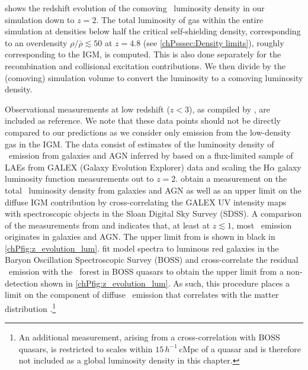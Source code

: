  shows the redshift evolution of the comoving \lya\ luminosity density in our simulation down to $z=2$. The total luminosity of gas within the entire simulation at densities below half the critical self-shielding density, corresponding to an overdensity $\rho/\bar{\rho} \lesssim 50$ at $z=4.8$ (see \cref{chPsssec:Density limits}), roughly corresponding to the IGM, is computed. This is also done separately for the recombination and collisional excitation contributions. We then divide by the (comoving) simulation volume to convert the luminosity to a comoving luminosity density.

Observational measurements at low redshift ($z<3$), as compiled by \citet{2019ApJ...877..150C}, are included as reference. We note that these data points should not be directly compared to our predictions as we consider only emission from the low-density gas in the IGM. The data consist of estimates of the luminosity density of \lya\ emission from galaxies and AGN inferred by \citet{2017ApJ...848..108W} based on a flux-limited sample of LAEs from GALEX (Galaxy Evolution Explorer) data and scaling the H$\alpha$ galaxy luminosity function measurements \citep{2013MNRAS.428.1128S} out to $z=2$. \citet{2019ApJ...877..150C} obtain a measurement on the total \lya\ luminosity density from galaxies and AGN as well as an upper limit on the diffuse IGM contribution by cross-correlating the GALEX UV intensity maps with spectroscopic objects in the Sloan Digital Sky Survey (SDSS). A comparison of the measurements from \citet{2019ApJ...877..150C} and \citet{2017ApJ...848..108W} indicates that, at least at $z \lesssim 1$, most \lya\ emission originates in galaxies and AGN. The upper limit from \citet[; converted to a luminosity density by \citealt{2019ApJ...877..150C}]{2018MNRAS.481.1320C} is shown in black in \cref{chPfig:z_evolution_lum}. \citet{2018MNRAS.481.1320C} fit model spectra to luminous red galaxies in the Baryon Oscillation Spectroscopic Survey (BOSS) and cross-correlate the residual \lya\ emission with the \lya\ forest in BOSS quasars to obtain the upper limit from a non-detection shown in \cref{chPfig:z_evolution_lum}. As such, this procedure places a limit on the component of diffuse \lya\ emission that correlates with the matter distribution \citep{2018MNRAS.481.1320C}.\footnote{An additional measurement, arising from a cross-correlation with BOSS quasars, is restricted to scales within $15 \, h^{-1} \, \mathrm{cMpc}$ of a quasar \citep[equivalent to only $\ssim 3\%$ of space, see][]{2018MNRAS.481.1320C} and is therefore not included as a global luminosity density in this chapter.}


